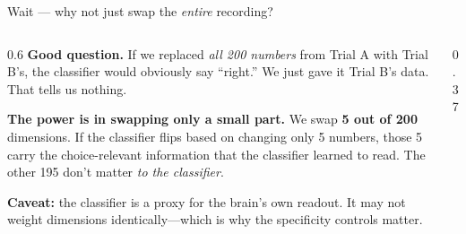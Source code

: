 \documentclass[aspectratio=169,11pt]{beamer}
\begin{document}
\begin{frame}{Wait --- why not just swap the \emph{entire} recording?}
\begin{columns}[T]
\begin{column}{0.6\textwidth}
{\small \textbf{Good question.} If we replaced \emph{all 200 numbers} from Trial A with Trial B's, the classifier would obviously say ``right.'' We just gave it Trial B's data. That tells us nothing.}

\vspace{0.4em}
{\small \textbf{The power is in swapping only a small part.} We swap \textbf{5 out of 200} dimensions. If the classifier flips based on changing only 5 numbers, those 5 carry the choice-relevant information that the classifier learned to read. The other 195 don't matter \emph{to the classifier}.}

\vspace{0.2em}
{\small \textbf{Caveat:} the classifier is a proxy for the brain's own readout. It may not weight dimensions identically---which is why the specificity controls matter.}

\end{column}
\begin{column}{0.37\textwidth}
\centering
{}
\end{column}
\end{columns}
\end{frame}
\end{document}

